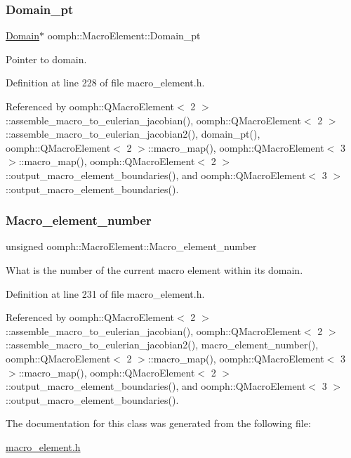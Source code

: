 \subsubsection{\texorpdfstring{Domain\+\_\+pt}{Domain\_pt}}
{\footnotesize\ttfamily \hyperlink{classoomph_1_1Domain}{Domain}$\ast$ oomph\+::\+Macro\+Element\+::\+Domain\+\_\+pt\hspace{0.3cm}{\ttfamily [protected]}}



Pointer to domain. 



Definition at line 228 of file macro\+\_\+element.\+h.



Referenced by oomph\+::\+Q\+Macro\+Element$<$ 2 $>$\+::assemble\+\_\+macro\+\_\+to\+\_\+eulerian\+\_\+jacobian(), oomph\+::\+Q\+Macro\+Element$<$ 2 $>$\+::assemble\+\_\+macro\+\_\+to\+\_\+eulerian\+\_\+jacobian2(), domain\+\_\+pt(), oomph\+::\+Q\+Macro\+Element$<$ 2 $>$\+::macro\+\_\+map(), oomph\+::\+Q\+Macro\+Element$<$ 3 $>$\+::macro\+\_\+map(), oomph\+::\+Q\+Macro\+Element$<$ 2 $>$\+::output\+\_\+macro\+\_\+element\+\_\+boundaries(), and oomph\+::\+Q\+Macro\+Element$<$ 3 $>$\+::output\+\_\+macro\+\_\+element\+\_\+boundaries().

\mbox{\label{classoomph_1_1MacroElement_a96e31a1ba7eac203a3bacb3403796ec1}} 
\subsubsection{\texorpdfstring{Macro\+\_\+element\+\_\+number}{Macro\_element\_number}}
{\footnotesize\ttfamily unsigned oomph\+::\+Macro\+Element\+::\+Macro\+\_\+element\+\_\+number\hspace{0.3cm}{\ttfamily [protected]}}



What is the number of the current macro element within its domain. 



Definition at line 231 of file macro\+\_\+element.\+h.



Referenced by oomph\+::\+Q\+Macro\+Element$<$ 2 $>$\+::assemble\+\_\+macro\+\_\+to\+\_\+eulerian\+\_\+jacobian(), oomph\+::\+Q\+Macro\+Element$<$ 2 $>$\+::assemble\+\_\+macro\+\_\+to\+\_\+eulerian\+\_\+jacobian2(), macro\+\_\+element\+\_\+number(), oomph\+::\+Q\+Macro\+Element$<$ 2 $>$\+::macro\+\_\+map(), oomph\+::\+Q\+Macro\+Element$<$ 3 $>$\+::macro\+\_\+map(), oomph\+::\+Q\+Macro\+Element$<$ 2 $>$\+::output\+\_\+macro\+\_\+element\+\_\+boundaries(), and oomph\+::\+Q\+Macro\+Element$<$ 3 $>$\+::output\+\_\+macro\+\_\+element\+\_\+boundaries().



The documentation for this class was generated from the following file\+:\begin{DoxyCompactItemize}
\item 
\hyperlink{macro__element_8h}{macro\+\_\+element.\+h}\end{DoxyCompactItemize}
